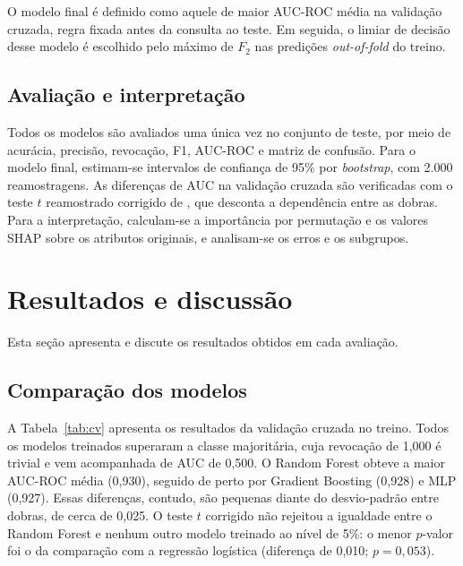 \documentclass[12pt]{article}
\begin{document}
O modelo final é definido como aquele de maior AUC-ROC média na validação
cruzada, regra fixada antes da consulta ao teste. Em seguida, o limiar de
decisão desse modelo é escolhido pelo máximo de $F_2$ nas predições
\textit{out-of-fold} do treino.

\subsection{Avaliação e interpretação}

Todos os modelos são avaliados uma única vez no conjunto de teste, por meio
de acurácia, precisão, revocação, F1, AUC-ROC e matriz de confusão. Para o
modelo final, estimam-se intervalos de confiança de 95\% por
\textit{bootstrap}, com 2.000 reamostragens. As diferenças de AUC na
validação cruzada são verificadas com o teste $t$ reamostrado corrigido de
\cite{nadeau:03}, que desconta a dependência entre as dobras. Para a
interpretação, calculam-se a importância por permutação e os valores SHAP
sobre os atributos originais, e analisam-se os erros e os subgrupos.

\section{Resultados e discussão}
\label{sec:resultados}

Esta seção apresenta e discute os resultados obtidos em cada avaliação.

\subsection{Comparação dos modelos}

A Tabela~\ref{tab:cv} apresenta os resultados da validação cruzada no treino.
Todos os modelos treinados superaram a classe majoritária, cuja revocação de
1,000 é trivial e vem acompanhada de AUC de 0,500. O Random Forest obteve a
maior AUC-ROC média (0,930), seguido de perto por Gradient Boosting (0,928) e
MLP (0,927). Essas diferenças, contudo, são pequenas diante do desvio-padrão
entre dobras, de cerca de 0,025. O teste $t$ corrigido não rejeitou a igualdade entre o Random Forest e
nenhum outro modelo treinado ao nível de 5\%: o menor $p$-valor foi o da
comparação com a regressão logística (diferença de 0,010; $p = 0{,}053$).
\end{document}

